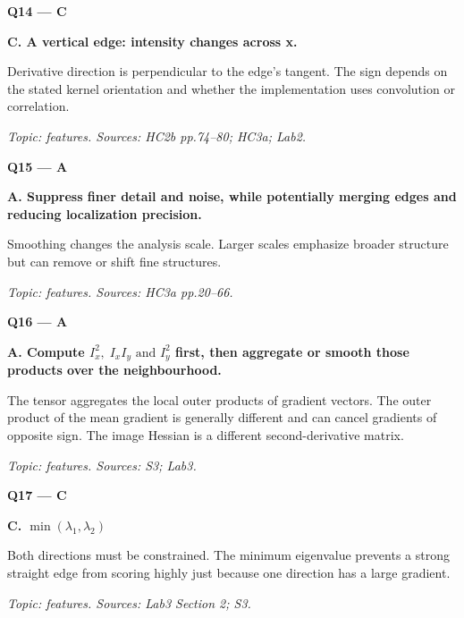 \documentclass[11pt,a4paper]{article}
\begin{document}
\par\vspace{12pt}
\begin{minipage}{\linewidth}
\textbf{Q14 — C}\par\smallskip
\textbf{C. A vertical edge: intensity changes across x.}\par
Derivative direction is perpendicular to the edge's tangent. The sign depends on the stated kernel orientation and whether the implementation uses convolution or correlation.\par
{\small\itshape Topic: features. Sources: HC2b pp.74–80; HC3a; Lab2.}

\end{minipage}
\par\vspace{12pt}
\begin{minipage}{\linewidth}
\textbf{Q15 — A}\par\smallskip
\textbf{A. Suppress finer detail and noise,\allowbreak{} while potentially merging edges and reducing localization precision.}\par
Smoothing changes the analysis scale. Larger scales emphasize broader structure but can remove or shift fine structures.\par
{\small\itshape Topic: features. Sources: HC3a pp.20–66.}

\end{minipage}
\par\vspace{12pt}
\begin{minipage}{\linewidth}
\textbf{Q16 — A}\par\smallskip
\textbf{A. Compute \(I_x^2,\;I_x I_y\text{ and }I_y^2\) first,\allowbreak{} then aggregate or smooth those products over the neighbourhood.}\par
The tensor aggregates the local outer products of gradient vectors. The outer product of the mean gradient is generally different and can cancel gradients of opposite sign. The image Hessian is a different second-derivative matrix.\par
{\small\itshape Topic: features. Sources: S3; Lab3.}

\end{minipage}
\par\vspace{12pt}
\begin{minipage}{\linewidth}
\textbf{Q17 — C}\par\smallskip
\textbf{C. \(\min(\lambda_1,\lambda_2)\)}\par
Both directions must be constrained. The minimum eigenvalue prevents a strong straight edge from scoring highly just because one direction has a large gradient.\par
{\small\itshape Topic: features. Sources: Lab3 Section 2; S3.}

\end{minipage}
\end{document}
